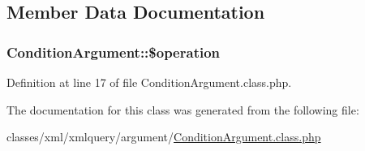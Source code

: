 \subsection{Member Data Documentation}
\subsubsection[{\texorpdfstring{\$operation}{$operation}}]{\setlength{\rightskip}{0pt plus 5cm}Condition\+Argument\+::\$operation}\hypertarget{classConditionArgument_acfccaada47560781bfbdf51086ce3869}{}\label{classConditionArgument_acfccaada47560781bfbdf51086ce3869}


Definition at line 17 of file Condition\+Argument.\+class.\+php.



The documentation for this class was generated from the following file\+:\begin{DoxyCompactItemize}
\item 
classes/xml/xmlquery/argument/\hyperlink{ConditionArgument_8class_8php}{Condition\+Argument.\+class.\+php}\end{DoxyCompactItemize}
